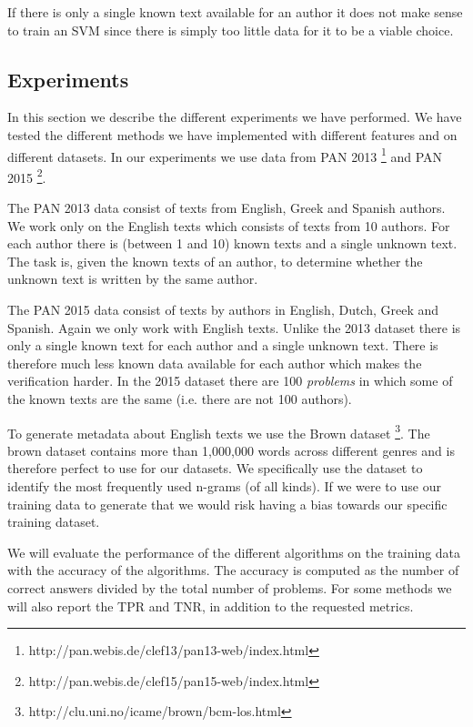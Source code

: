 If there is only a single known text available for an author it does not make
sense to train an \gls{SVM} since there is simply too little data for it
to be a viable choice.

\subsection{Experiments} \label{subsec:method:experiments}
In this section we describe the different experiments we have performed.
We have tested the different methods we have implemented with different
features and on different datasets. In our experiments we use data from PAN
2013 \footnote{http://pan.webis.de/clef13/pan13-web/index.html} and PAN 2015
\footnote{http://pan.webis.de/clef15/pan15-web/index.html}.

The PAN 2013 data consist of texts from English, Greek and Spanish authors. We
work only on the English texts which consists of texts from 10 authors. For each
author there is (between 1 and 10) known texts and a single unknown text. The
task is, given the known texts of an author, to determine whether the unknown
text is written by the same author.

The PAN 2015 data consist of texts by authors in English, Dutch, Greek and
Spanish. Again we only work with English texts. Unlike the 2013 dataset there
is only a single known text for each author and a single unknown text. There
is therefore much less known data available for each author which makes the
verification harder. In the 2015 dataset there are 100 \textit{problems} in
which some of the known texts are the same (i.e. there are not 100 authors).

To generate metadata about English texts we use the Brown dataset
\footnote{http://clu.uni.no/icame/brown/bcm-los.html}. The brown dataset
contains more than 1,000,000 words across different genres and is therefore
perfect to use for our datasets. We specifically use the dataset to identify
the most frequently used n-grams (of all kinds). If we were to use our training
data to generate that we would risk having a bias towards our specific training
dataset.

We will evaluate the performance of the different algorithms on the training
data with the accuracy of the algorithms. The accuracy is computed as the number
of correct answers divided by the total number of problems. For some methods
we will also report the \gls{TPR} and \gls{TNR}, in addition to the requested
metrics.

